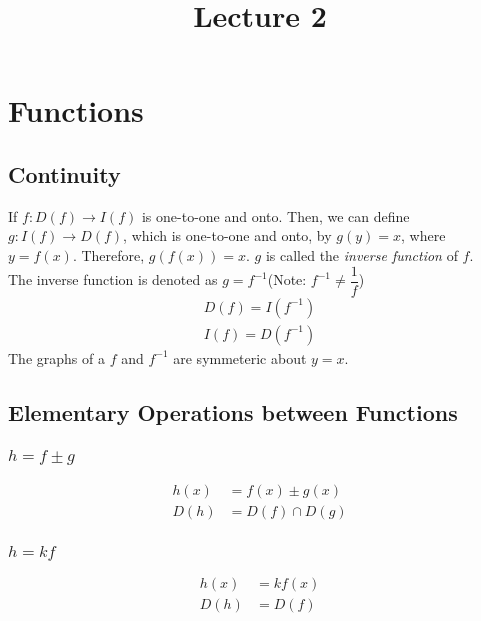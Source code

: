 \documentclass[fleqn]{article}
\title{Lecture 2}
\author{}
\date{\formatdate{30}{10}{2014}}
\begin{document}
	
\maketitle
\setlength{\mathindent}{0pt}

\tableofcontents

\newpage
\section{Functions}

\subsection{Continuity}

If $f : D(f) \rightarrow I(f)$ is one-to-one and onto. Then, we can define $g : I(f) \rightarrow D(f)$, which is one-to-one and onto, by $g(y) = x$, where $y = f(x)$. Therefore, $g(f(x)) = x$. $g$ is called the \emph{inverse function} of $f$. \\
The inverse function is denoted as $g = f^{-1}$(Note: $f^{-1} \neq \dfrac{1}{f}$)
\begin{align}
	D(f) = I(f^{-1}) \label{Image of inverse}\\
	I(f) = D(f^{-1}) \label{Domain of inverse}
\end{align}
The graphs of a $f$ and $f^{-1}$ are symmeteric about $y=x$.

\subsection{Elementary Operations between Functions}

\subsubsection{$h = f \pm g$}

\begin{align}
	h(x) &= f(x) \pm g(x) \label{sum of functions}\\
	D(h) &= D(f) \cap D(g) \label{domain of sum of functions}
\end{align}

\subsubsection{$h = kf$}

\begin{align}
	h(x) &= k f(x) \label{product of constant and function}\\
	D(h) &= D(f)  \label{domain of product of constant and function}
\end{align}
\end{document}
